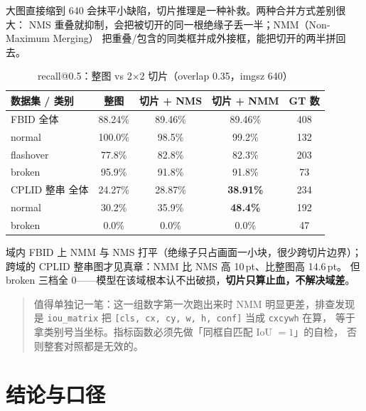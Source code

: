\documentclass[UTF8,a4paper,11pt]{ctexart}
\begin{document}
大图直接缩到 640 会抹平小缺陷，切片推理是一种补救。两种合并方式差别很大：
NMS 重叠就抑制，会把被切开的同一根绝缘子丢一半；NMM（Non-Maximum Merging）
把重叠/包含的同类框并成外接框，能把切开的两半拼回去。

\begin{table}[htbp]
  \centering
  \caption{recall@0.5：整图 vs 2$\times$2 切片（overlap 0.35，imgsz 640）}
  \label{tab:tiled}
  \begin{tabular}{lcccc}
    \toprule
    数据集 / 类别 & 整图 & 切片 + NMS & 切片 + NMM & GT 数 \\
    \midrule
    FBID 全体 & 88.24\% & 89.46\% & 89.46\% & 408 \\
    \quad normal & 100.0\% & 98.5\% & 99.2\% & 132 \\
    \quad flashover & 77.8\% & 82.8\% & 82.3\% & 203 \\
    \quad broken & 95.9\% & 91.8\% & 91.8\% & 73 \\
    \midrule
    CPLID 整串 全体 & 24.27\% & 28.87\% & \textbf{38.91\%} & 234 \\
    \quad normal & 30.2\% & 35.9\% & \textbf{48.4\%} & 192 \\
    \quad broken & 0.0\% & 0.0\% & 0.0\% & 47 \\
    \bottomrule
  \end{tabular}
\end{table}

域内 FBID 上 NMM 与 NMS 打平（绝缘子只占画面一小块，很少跨切片边界）；
跨域的 CPLID 整串图才见真章：NMM 比 NMS 高 10\,pt、比整图高 14.6\,pt。
但 broken 三档全 0——模型在该域根本认不出破损，\textbf{切片只算止血，不解决域差}。

\begin{quote}
\small 值得单独记一笔：这一组数字第一次跑出来时 NMM 明显更差，排查发现是
\texttt{iou\_matrix} 把 \texttt{[cls, cx, cy, w, h, conf]} 当成 \texttt{cxcywh} 在算，
等于拿类别号当坐标。指标函数必须先做「同框自匹配 IoU $=1$」的自检，
否则整套对照都是无效的。
\end{quote}

\section{结论与口径}
\end{document}
